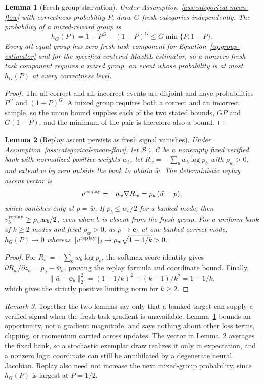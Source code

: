 \documentclass{article}
\newcommand{\1}{\mathbf 1}
\newtheorem{lemma}{Lemma}[section]
\theoremstyle{remark}
\newtheorem{remark}[lemma]{Remark}
\theoremstyle{definition}
\theoremstyle{plain}
\begin{document}
\begin{lemma}[Fresh-group starvation]
\label{lem:replay-gradient-availability}
Under Assumption~\ref{ass:categorical-mean-flow} with correctness probability
$P$, draw $G$ fresh categories independently. The probability of a
mixed-reward group is
\[
 h_G(P)=1-P^G-(1-P)^G\le G\min\{P,1-P\}.
\]
Every all-equal group has zero fresh task component for
Equation~\eqref{eq:group-estimator} and for the specified centered MaxRL
estimator, so a nonzero fresh task component requires a mixed group, an event
whose probability is at most $h_G(P)$ at every correctness level.
\end{lemma}

\begin{proof}
The all-correct and all-incorrect events are disjoint and have probabilities
$P^G$ and $(1-P)^G$. A mixed group requires both a correct and an incorrect
sample, so the union bound supplies each of the two stated bounds, $GP$ and
$G(1-P)$, and the minimum of the pair is therefore also a bound.
\end{proof}

\begin{lemma}[Replay ascent persists as fresh signal vanishes]
\label{lem:replay-ascent}
Under Assumption~\ref{ass:categorical-mean-flow}, let
$\mathcal B\subseteq\mathcal C$ be a nonempty fixed verified bank with
normalized positive weights $w_b$, let $R_w=-\sum_b w_b\log p_b$ with
$\rho_w>0$, and extend $w$ by zero outside the bank to obtain $\bar w$. The
deterministic replay ascent vector is
\[
 v^{\rm replay}=-\rho_w\nabla R_w=\rho_w(\bar w-p),
\]
which vanishes only at $p=\bar w$. If $p_b\le w_b/2$ for a banked mode, then
$v^{\rm replay}_b\ge\rho_w w_b/2$, even when $b$ is absent from the fresh
group. For a uniform bank of $k\ge2$ modes and fixed $\rho_w>0$, as
$p\to\mathbf e_b$ at one banked correct mode, $h_G(P)\to0$ whereas
$\|v^{\rm replay}\|_2\to\rho_w\sqrt{1-1/k}>0$.
\end{lemma}

\begin{proof}
For $R_w=-\sum_b w_b\log p_b$, the softmax score identity gives
$\partial R_w/\partial z_a=p_a-\bar w_a$, proving the replay formula and
coordinate bound. Finally,
\[
 \|\bar w-\mathbf e_b\|_2^2=(1-1/k)^2+(k-1)/k^2=1-1/k,
\]
which gives the strictly positive limiting norm for $k\ge2$.
\end{proof}

\begin{remark}
Together the two lemmas say only that a banked target can supply a verified
signal when the fresh task gradient is unavailable. Lemma~\ref{lem:replay-gradient-availability}
bounds an opportunity, not a gradient magnitude, and says nothing about other
loss terms, clipping, or momentum carried across updates. The vector in
Lemma~\ref{lem:replay-ascent} averages the fixed bank, so a stochastic
exemplar draw realizes it only in expectation, and a nonzero logit coordinate
can still be annihilated by a degenerate neural Jacobian. Replay also need not
increase the next mixed-group probability, since $h_G(P)$ is largest at
$P=1/2$.
\end{remark}
\end{document}

